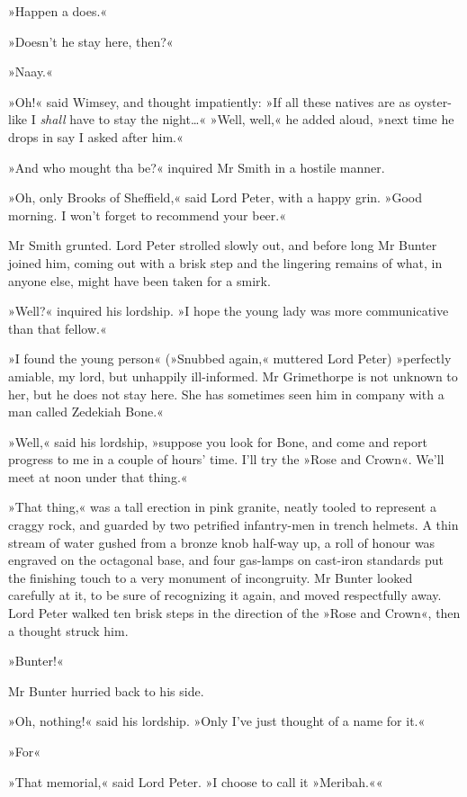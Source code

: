 »Happen a does.«

»Doesn't he stay here, then?«

»Naay.«

»Oh!« said Wimsey, and thought impatiently: »If all these natives are as oyster-like I \textit{shall} have to stay the night\dots« »Well, well,« he added aloud, »next time he drops in say I asked after him.«

»And who mought tha be?« inquired Mr Smith in a hostile manner.

»Oh, only Brooks of Sheffield,« said Lord Peter, with a happy grin. »Good morning. I won't forget to recommend your beer.«

Mr Smith grunted. Lord Peter strolled slowly out, and before long Mr Bunter joined him, coming out with a brisk step and the lingering remains of what, in anyone else, might have been taken for a smirk.

»Well?« inquired his lordship. »I hope the young lady was more communicative than that fellow.«

»I found the young person« (»Snubbed again,« muttered Lord Peter) »perfectly amiable, my lord, but unhappily ill-informed. Mr Grimethorpe is not unknown to her, but he does not stay here. She has sometimes seen him in company with a man called Zedekiah Bone.«

»Well,« said his lordship, »suppose you look for Bone, and come and report progress to me in a couple of hours' time. I'll try the »Rose and Crown«. We'll meet at noon under that thing.«

»That thing,« was a tall erection in pink granite, neatly tooled to represent a craggy rock, and guarded by two petrified infantry-men in trench helmets. A thin stream of water gushed from a bronze knob half-way up, a roll of honour was engraved on the octagonal base, and four gas-lamps on cast-iron standards put the finishing touch to a very monument of incongruity. Mr Bunter looked carefully at it, to be sure of recognizing it again, and moved respectfully away. Lord Peter walked ten brisk steps in the direction of the »Rose and Crown«, then a thought struck him.

»Bunter!«

Mr Bunter hurried back to his side.

»Oh, nothing!« said his lordship. »Only I've just thought of a name for it.«

»For\longdash«

»That memorial,« said Lord Peter. »I choose to call it »Meribah.««

